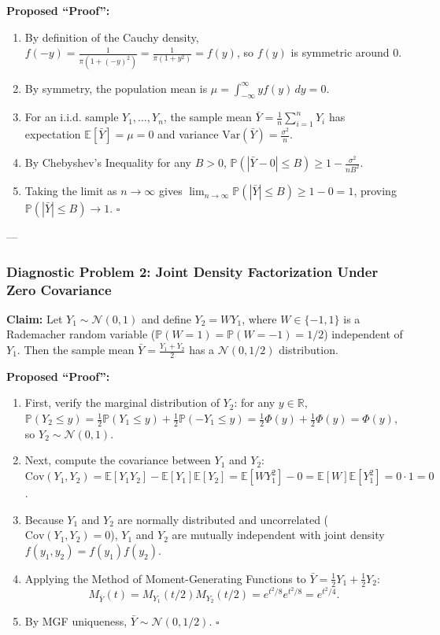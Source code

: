 \documentclass[11pt, letterpaper]{article}
\theoremstyle{definition}
\theoremstyle{remark}
\newcommand{\R}{\mathbb{R}}
\newcommand{\E}{\mathbb{E}}
\newcommand{\Prob}{\mathbb{P}}
\begin{document}
\textbf{Proposed ``Proof'':}
\begin{enumerate}[label=\textbf{Line \arabic*:}]
    \item By definition of the Cauchy density, $f(-y) = \frac{1}{\pi(1 + (-y)^2)} = \frac{1}{\pi(1 + y^2)} = f(y)$, so $f(y)$ is symmetric around $0$.
    \item By symmetry, the population mean is $\mu = \int_{-\infty}^{\infty} y f(y) \, dy = 0$.
    \item For an i.i.d. sample $Y_1, \dots, Y_n$, the sample mean $\bar{Y} = \frac{1}{n}\sum_{i=1}^n Y_i$ has expectation $\E[\bar{Y}] = \mu = 0$ and variance $\text{Var}(\bar{Y}) = \frac{\sigma^2}{n}$.
    \item By Chebyshev's Inequality for any $B > 0$, $\Prob(|\bar{Y} - 0| \le B) \ge 1 - \frac{\sigma^2}{n B^2}$.
    \item Taking the limit as $n \to \infty$ gives $\lim_{n \to \infty} \Prob(|\bar{Y}| \le B) \ge 1 - 0 = 1$, proving $\Prob(|\bar{Y}| \le B) \to 1$. \hfill $\square$
\end{enumerate}

---

\subsubsection*{Diagnostic Problem 2: Joint Density Factorization Under Zero Covariance}
\textbf{Claim:} Let $Y_1 \sim \mathcal{N}(0, 1)$ and define $Y_2 = W Y_1$, where $W \in \{-1, 1\}$ is a Rademacher random variable ($\Prob(W = 1) = \Prob(W = -1) = 1/2$) independent of $Y_1$. Then the sample mean $\bar{Y} = \frac{Y_1 + Y_2}{2}$ has a $\mathcal{N}(0, 1/2)$ distribution.

\textbf{Proposed ``Proof'':}
\begin{enumerate}[label=\textbf{Line \arabic*:}]
    \item First, verify the marginal distribution of $Y_2$: for any $y \in \R$, $\Prob(Y_2 \le y) = \frac{1}{2}\Prob(Y_1 \le y) + \frac{1}{2}\Prob(-Y_1 \le y) = \frac{1}{2}\Phi(y) + \frac{1}{2}\Phi(y) = \Phi(y)$, so $Y_2 \sim \mathcal{N}(0, 1)$.
    \item Next, compute the covariance between $Y_1$ and $Y_2$: $\text{Cov}(Y_1, Y_2) = \E[Y_1 Y_2] - \E[Y_1]\E[Y_2] = \E[W Y_1^2] - 0 = \E[W]\E[Y_1^2] = 0 \cdot 1 = 0$.
    \item Because $Y_1$ and $Y_2$ are normally distributed and uncorrelated ($\text{Cov}(Y_1, Y_2) = 0$), $Y_1$ and $Y_2$ are mutually independent with joint density $f(y_1, y_2) = f(y_1)f(y_2)$.
    \item Applying the Method of Moment-Generating Functions to $\bar{Y} = \frac{1}{2}Y_1 + \frac{1}{2}Y_2$:
    \[
        M_{\bar{Y}}(t) = M_{Y_1}(t/2) M_{Y_2}(t/2) = e^{t^2/8} e^{t^2/8} = e^{t^2/4}.
    \]
    \item By MGF uniqueness, $\bar{Y} \sim \mathcal{N}(0, 1/2)$. \hfill $\square$
\end{enumerate}
\end{document}
